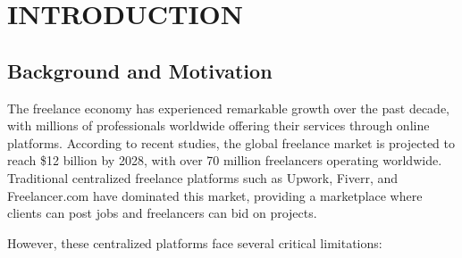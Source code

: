 \documentclass[a4paper,13pt,twoside]{report}
\theoremstyle{definition}
\begin{document}
\newpage
{}
\pagestyle{fancy}
\fancyhf{}
\fancyhead[RE, LO]{\leftmark}
\fancyfoot[RE, LO]{\thepage}

\chapter{INTRODUCTION}
\label{chapter:Introduction}

\section{Background and Motivation}

The freelance economy has experienced remarkable growth over the past decade, with millions of professionals worldwide offering their services through online platforms. According to recent studies, the global freelance market is projected to reach \$12 billion by 2028, with over 70 million freelancers operating worldwide. Traditional centralized freelance platforms such as Upwork, Fiverr, and Freelancer.com have dominated this market, providing a marketplace where clients can post jobs and freelancers can bid on projects.

However, these centralized platforms face several critical limitations:
\end{document}
